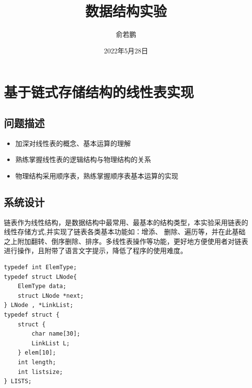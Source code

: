 \documentclass[supercite]{Experimental_Report}
\title{~~~~~~数据结构实验~~~~~~}
\author{俞若鹏}
\date{2022年5月28日}
\theoremstyle{definition}
\begin{document}
\maketitle

\clearpage


\tableofcontents[level=2]

\clearpage


\setlength{\parindent}{2em}

\lstset{language=C}



\section{基于链式存储结构的线性表实现}


\subsection{问题描述}

\begin{itemize}
	\item 加深对线性表的概念、基本运算的理解
	\item 熟练掌握线性表的逻辑结构与物理结构的关系
	\item 物理结构采用顺序表，熟练掌握顺序表基本运算的实现
\end{itemize}


\subsection{系统设计}

链表作为线性结构，是数据结构中最常用、最基本的结构类型，本实验采用链表的线性存储方式,并实现了链表各类基本功能如：增添、
删除、遍历等，并在此基础之上附加翻转、倒序删除、排序。多线性表操作等功能，更好地方便使用者对链表进行操作，且附带了语言文字提示，降低了程序的使用难度。
\begin{center}
	\label{lst-1}
\end{center}
\begin{lstlisting}	
typedef int ElemType;
typedef struct LNode{ 
  	ElemType data;
  	struct LNode *next;
} LNode , *LinkList;
typedef struct {     
 	struct { 
      	char name[30];
 		LinkList L;	
  	} elem[10];
 	int length;
  	int listsize;
} LISTS;
\end{lstlisting}
\end{document}

